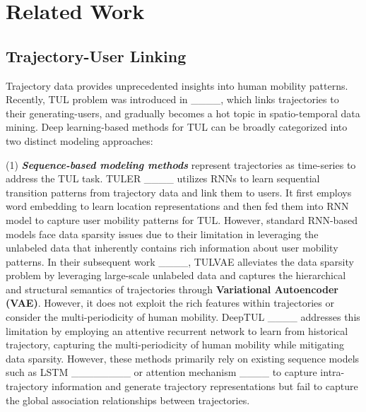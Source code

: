 \section{Related Work}
\subsection{Trajectory-User Linking}

Trajectory data provides unprecedented insights into human mobility patterns. Recently, TUL problem was introduced in ____,  which links trajectories to their generating-users, and gradually becomes a hot topic in spatio-temporal data mining. Deep learning-based methods for TUL can be broadly categorized into two distinct modeling approaches:

(1) \textbf{\textit{Sequence-based modeling methods}} represent trajectories as time-series to address the TUL task. TULER ____ utilizes RNNs to learn sequential transition patterns from trajectory data and link them to users. It first employs word embedding to learn location representations and then fed them into RNN model to capture user mobility patterns for TUL. However, standard RNN-based models face data sparsity issues due to their limitation in leveraging the unlabeled data that inherently contains rich information about user mobility patterns. In their subsequent work ____, TULVAE alleviates the data sparsity problem by leveraging large-scale unlabeled data and captures the hierarchical and structural semantics of trajectories through \textbf{Variational Autoencoder (VAE)}. However, it does not exploit the rich features within trajectories or consider the multi-periodicity of human mobility. DeepTUL ____ addresses this limitation by employing an attentive recurrent network to learn from historical trajectory, capturing the multi-periodicity of human mobility while mitigating data sparsity. However, these methods primarily rely on existing sequence models such as LSTM ________ or attention mechanism ____ to capture intra-trajectory information and generate trajectory representations but fail to capture the global association relationships between trajectories.

